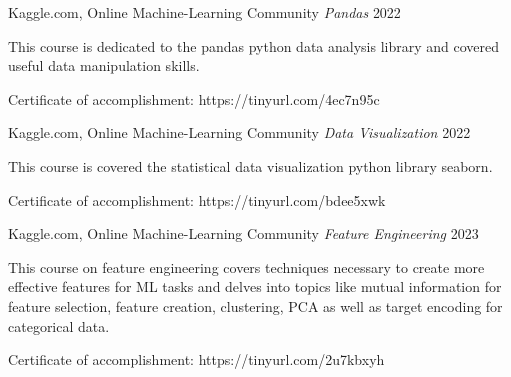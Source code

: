 \begin{cventries}
  \cventry
  {Kaggle.com, Online Machine-Learning Community} %
  {\textit{Pandas}}
  {} %
  {2022} %
  {
    \begin{cvitems} %
      \item {This course is dedicated to the pandas python data analysis library and covered useful data manipulation skills.}
      \item {Certificate of accomplishment: https://tinyurl.com/4ec7n95c}
    \end{cvitems}
  }
  \newline

\cventry
{Kaggle.com, Online Machine-Learning Community} %
{\textit{Data Visualization}}
{} %
{2022} %
{
  \begin{cvitems} %
    \item {This course is covered the statistical data visualization python library seaborn.}
    \item {Certificate of accomplishment: https://tinyurl.com/bdee5xwk}
  \end{cvitems}
}
\newline

\cventry
{Kaggle.com, Online Machine-Learning Community} %
{\textit{Feature Engineering}}
{} %
{2023} %
{
  \begin{cvitems} %
    \item {This course on feature engineering covers techniques necessary to create more effective features for ML tasks and delves into topics like mutual information for feature selection, feature creation, clustering, PCA as well as target encoding for categorical data.}
    \item {Certificate of accomplishment: https://tinyurl.com/2u7kbxyh}
  \end{cvitems}
}
\newline


\end{cventries}
